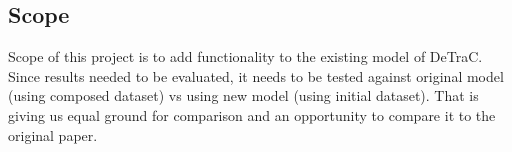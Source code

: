 \subsection{Scope}
Scope of this project is to add functionality to the existing model of DeTraC. Since results needed to be evaluated, it needs to be tested against original model (using composed dataset) vs using new model (using initial dataset). That is giving us equal ground for comparison and an opportunity to compare it to the original paper.